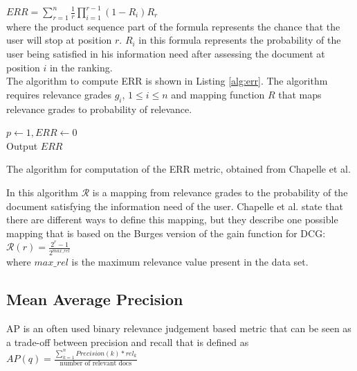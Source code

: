 $ERR = \sum\nolimits_{r=1}^n \frac{1}{r} \prod\nolimits_{i=1}^{r-1}(1-R_i)R_r$\\

where the product sequence part of the formula represents the chance that the user will stop at position $r$. $R_i$ in this formula represents the probability of the user being satisfied in his information need after assessing the document at position $i$ in the ranking.\\

The algorithm to compute \ac{ERR} is shown in Listing \ref{alg:err}. The algorithm requires relevance grades $g_i$, $1 \le i \le n$ and mapping function $R$ that maps relevance grades to probability of relevance.\\

\LinesNumbered
\begin{algorithm}[H]
 $p \leftarrow 1, ERR \leftarrow 0$\\
 Output $ERR$
 \caption{The algorithm for computation of the \acs{ERR} metric, obtained from Chapelle et al. \cite{Chapelle2009}}
 \label{alg:err}
\end{algorithm}
\vspace{0.5cm}
In this algorithm $\mathcal{R}$ is a mapping from relevance grades to the probability of the document satisfying the information need of the user. Chapelle et al. \cite{Chapelle2009} state that there are different ways to define this mapping, but they describe one possible mapping that is based on the Burges version \cite{Burges2005} of the gain function for \ac{DCG}:\\

$\mathcal{R}(r) = \frac{2^{r}-1}{2^{max\_rel}}$\\

\noindent where $max\_rel$ is the maximum relevance value present in the data set.

\subsection{Mean Average Precision}
\ac{AP} \cite{Zhu2004} is an often used binary relevance judgement based metric that can be seen as a trade-off between precision and recall that is defined as\\

$AP(q) = \frac{\sum\nolimits_{k=1}^{n}Precision(k)*rel_k}{\text{number of relevant docs}}$\\

